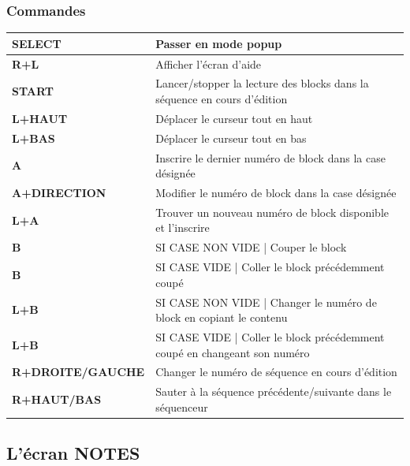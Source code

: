 \documentclass[12pt,a4paper]{article}
\begin{document}
    \subsubsection{Commandes}
    \tablelasttail{\hline}
    \begin{supertabular}{|l|p{11cm}|}
    \hline
        {\bf SELECT} & Passer en mode popup \\
        \hline
        {\bf R+L} & Afficher l'écran d'aide \\
        \hline
        {\bf START} & Lancer/stopper la lecture des blocks dans la séquence en cours d'édition \\
        \hline
        {\bf L+HAUT} & Déplacer le curseur tout en haut \\
        \hline
        {\bf L+BAS} & Déplacer le curseur tout en bas \\
        \hline
        {\bf A} & Inscrire le dernier numéro de block dans la case désignée \\
        \hline
        {\bf A+DIRECTION} & Modifier le numéro de block dans la case désignée \\
        \hline
        {\bf L+A} & Trouver un nouveau numéro de block disponible et l'inscrire \\
        \hline
        {\bf B} & SI CASE NON VIDE | Couper le block \\
        \hline
        {\bf B} & SI CASE VIDE | Coller le block précédemment coupé \\
        \hline
        {\bf L+B} & SI CASE NON VIDE | Changer le numéro de block en copiant le contenu \\
        \hline
        {\bf L+B} & SI CASE VIDE | Coller le block précédemment coupé en changeant son numéro \\
        \hline
        {\bf R+DROITE/GAUCHE} & Changer le numéro de séquence en cours d'édition \\
        \hline
        {\bf R+HAUT/BAS} & Sauter à la séquence précédente/suivante dans le séquenceur \\
    \hline
    \end{supertabular}
        
    
    \subsection{L'écran NOTES}
    
\end{document}
